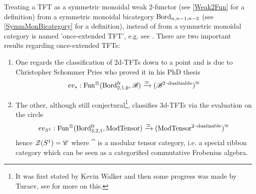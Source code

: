 \begin{rem}
    Treating a TFT as a symmetric monoidal weak 2-functor (see \ref{Weak2Fun} for a definition)
     from
     a symmetric monoidal bicategory 
    $\operatorname{Bord}_{n,n-1,n-2}$
    (see \ref{SymmMonBicategory} for a definition), instead of from a symmetric monoidal category
     is
     named 'once-extended TFT', e.g. see \cite{SchwHopfQuantumTFT}. There are two important
      results
      regarding once-extended TFTs: 
    \begin{enumerate}
\item One regards the classification of 2d-TFTs down to a point and is due to Christopher Schommer Pries who
 proved it in his PhD thesis 
 $$
 ev_{\ast}:
 \operatorname{Fun}^\otimes (\operatorname{Bord}_{2,1,0}^{\operatorname{fr}}, \mathscr{B}) \xrightarrow{\simeq} (\mathscr{B}^{2\operatorname{-dualizable}})^{\cong} $$
\item The other, although still conjectural\footnote{It was first stated by Kevin Walker and then some progress was made by Turaev, see \cite{Turaev+2016} for more on this.}, classifies 3d-TFTs via the evaluation on the circle
$$  ev_{S^1}:\operatorname{Fun}^\otimes (\operatorname{Bord}_{3,2,1}^{\operatorname{fr}}, \operatorname{ModTensor}) \xrightarrow{\simeq}(\operatorname{ModTensor}^{2\operatorname{-dualizable}})^{\cong}$$ %
hence $\mathcal{Z}(S^1)=\mathscr{C}$ where $\cat$ is a modular tensor category, i.e. a special ribbon category which can be seen as a categorified commutative Frobenius algebra.
    \end{enumerate}
    

\end{rem}
